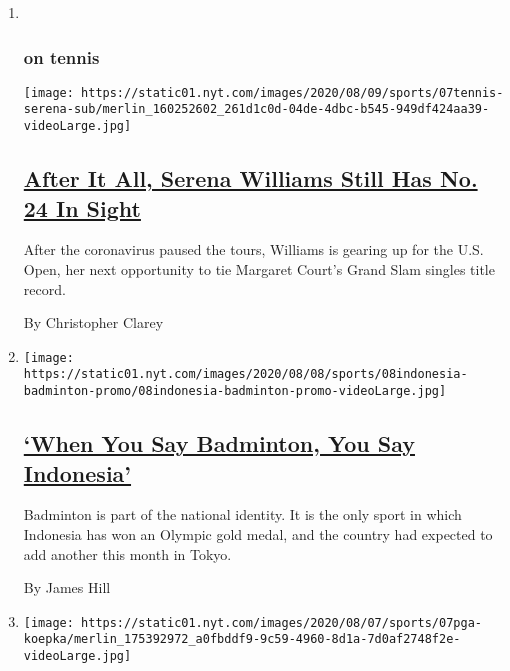 \begin{enumerate}
\def\labelenumi{\arabic{enumi}.}
\item ~
  \hypertarget{on-tennis}{%
  \subsubsection{on tennis}\label{on-tennis}}

  \texttt{[image: https://static01.nyt.com/images/2020/08/09/sports/07tennis-serena-sub/merlin\_160252602\_261d1c0d-04de-4dbc-b545-949df424aa39-videoLarge.jpg]}

  \hypertarget{after-it-all-serena-williams-still-has-no-24-in-sight}{%
  \subsection{\texorpdfstring{\href{/2020/08/07/sports/tennis/serena-williams-us-open.html}{After
  It All, Serena Williams Still Has No. 24 In
  Sight}}{After It All, Serena Williams Still Has No. 24 In Sight}}\label{after-it-all-serena-williams-still-has-no-24-in-sight}}

  After the coronavirus paused the tours, Williams is gearing up for the
  U.S. Open, her next opportunity to tie Margaret Court's Grand Slam
  singles title record.

  By Christopher Clarey
\item
  \texttt{[image: https://static01.nyt.com/images/2020/08/08/sports/08indonesia-badminton-promo/08indonesia-badminton-promo-videoLarge.jpg]}

  \hypertarget{when-you-say-badminton-you-say-indonesia}{%
  \subsection{\texorpdfstring{\href{/2020/08/07/sports/badminton-indonesia.html}{`When
  You Say Badminton, You Say
  Indonesia'}}{`When You Say Badminton, You Say Indonesia'}}\label{when-you-say-badminton-you-say-indonesia}}

  Badminton is part of the national identity. It is the only sport in
  which Indonesia has won an Olympic gold medal, and the country had
  expected to add another this month in Tokyo.

  By James Hill
\item
  \texttt{[image: https://static01.nyt.com/images/2020/08/07/sports/07pga-koepka/merlin\_175392972\_a0fbddf9-9c59-4960-8d1a-7d0af2748f2e-videoLarge.jpg]}

  \hypertarget{brooks-koepka-is-here-to-win-majors-not-friends}{%
}
\end{enumerate}
